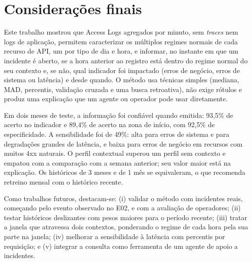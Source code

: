 \documentclass[sigconf,nonacm]{acmart}
\begin{document}
\section{Considerações finais}\label{sec:conclusao}

Este trabalho mostrou que Access Logs agregados por minuto, sem \emph{traces} nem logs de aplicação, permitem caracterizar os múltiplos regimes normais de cada recurso de API, um por tipo de dia e hora, e informar, no instante em que um incidente é aberto, se a hora anterior ao registro está dentro do regime normal do seu contexto e, se não, qual indicador foi impactado (erros de negócio, erros de sistema ou latência) e desde quando. O método usa técnicas simples (mediana, MAD, percentis, validação cruzada e uma busca retroativa), não exige rótulos e produz uma explicação que um agente ou operador pode usar diretamente.

Em dois meses de teste, a informação foi confiável quando emitida: 93,5\% de acerto no indicador e 89,4\% de acerto na zona de início, com 92,5\% de especificidade. A sensibilidade foi de 49\%: alta para erros de sistema e para degradações grandes de latência, e baixa para erros de negócio em recursos com muitos 4xx naturais. O perfil contextual superou um perfil sem contexto e empatou com a comparação com a semana anterior; seu valor maior está na explicação. Os históricos de 3 meses e de 1 mês se equivaleram, o que recomenda retreino mensal com o histórico recente.

Como trabalhos futuros, destacam-se: (i) validar o método com incidentes reais, começando pelo evento observado no E02, e com a avaliação de operadores; (ii) testar históricos deslizantes com pesos maiores para o período recente; (iii) tratar a janela que atravessa dois contextos, ponderando o regime de cada hora pela sua parte na janela; (iv) melhorar a sensibilidade à latência com percentis por requisição; e (v) integrar a consulta como ferramenta de um agente de apoio a incidentes.



\end{document}
